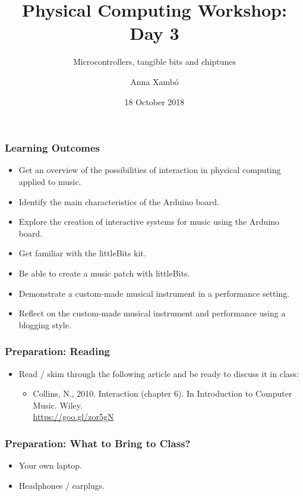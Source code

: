 \documentclass[screen, aspectratio=43]{beamer}
\title[PCW-d1]{Physical Computing Workshop: Day 3}
\subtitle{Microcontrollers, tangible bits and chiptunes}
\author[A. Xamb{\'o}]{Anna Xamb{\'o}}
\institute[NTNU]{Department of Music, NTNU}
\date{18 October 2018}
\begin{document}
\begin{frame}
  \titlepage
\end{frame}
%
\begin{frame}
  \frametitle{Learning Outcomes}
  \begin{itemize}
    \item Get an overview of the possibilities of interaction in physical computing applied to music.
    \item Identify the main characteristics of the Arduino board.
    \item Explore the creation of interactive systems for music using the Arduino board.    
    \item Get familiar with the littleBits kit.
    \item Be able to create a music patch with littleBits.
    \item Demonstrate a custom-made musical instrument in a performance setting.
    \item Reflect on the custom-made musical instrument and performance using a blogging style.   
  \end{itemize}
\end{frame}
\begin{frame}
  \frametitle{Preparation: Reading}
        \begin{itemize}
        \item Read / skim through the following article and be ready to discuss it in class:
         \begin{itemize}
         \item Collins, N., 2010. Interaction (chapter 6). In Introduction to Computer Music. Wiley. \\
         \url{https://goo.gl/zor5gN}
         \end{itemize}    
         \end{itemize}
\end{frame}
%
\begin{frame}
  \frametitle{Preparation: What to Bring to Class?}
        \begin{itemize}
        \item Your own laptop.
        \item Headphones / earplugs.
         \end{itemize}
\end{frame}
\end{document}
